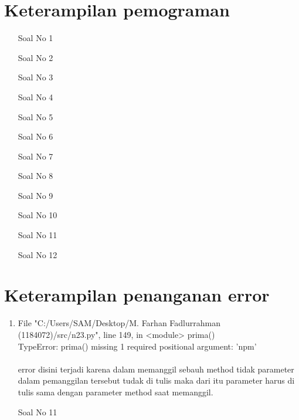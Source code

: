 \documentclass[12pt]{article}
\begin{document}
\section{Keterampilan pemograman}
	\begin{enumerate}
		\item[Soal No 1] 

		\item[Soal No 2] 
		
		\item[Soal No 3] 
		
		\item[Soal No 4] 
		
		\item[Soal No 5] 
		
		\item[Soal No 6] 
		
		\item[Soal No 7] 
		
		\item[Soal No 8] 
		
		\item[Soal No 9] 
		
		\item[Soal No 10] 
		
		\item[Soal No 11] 
		
		\item[Soal No 12]  
		
	\end{enumerate}
	
	
\section{Keterampilan penanganan error}
		\begin{enumerate}
			\item File "C:/Users/SAM/Desktop/M. Farhan Fadlurrahman (1184072)/src/n23.py", line 149, in <module>
    prima()\\

TypeError: prima() missing 1 required positional argument: 'npm'\\\\
		error disini terjadi karena dalam memanggil sebauh method tidak parameter dalam pemanggilan tersebut tudak di tulis maka dari itu parameter harus di tulis sama dengan parameter method saat memanggil.
		\item[Soal No 11] 
		


		\end{enumerate}
\end{document}

